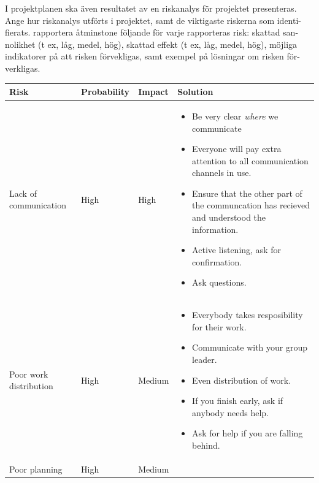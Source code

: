 \documentclass{article}
\begin{document}
    I projektplanen ska även resultatet av en riskanalys för projektet presenteras.
    Ange hur riskanalys utförts i projektet, samt de viktigaste riskerna som identi-
    fierats. rapportera åtminstone följande för varje rapporteras risk: skattad san-
    nolikhet (t ex, låg, medel, hög), skattad effekt (t ex, låg, medel, hög), möjliga
    indikatorer på att risken förvekligas, samt exempel på lösningar om risken för-
    verkligas.
    \begin{table}[h]
        \centering
        \begin{tabular}{|l|l|l|l|}
            \hline
                Risk & Probability & Impact & Solution \\
            \hline
            Lack of communication & High & High 
                & \parbox{.45\textwidth}
                {\begin{itemize}
                    \item Be very clear \emph{where} we communicate
                    \item Everyone will pay extra attention to all communication channels
                        in use.
                    \item Ensure that the other part of the communcation has recieved
                        and understood the information.
                    \item Active listening, ask for confirmation.
                    \item Ask questions.
                 \end{itemize}}\\
            \hline
            Poor work distribution & High & Medium 
                & \parbox{.45\textwidth}
                {\begin{itemize}
                    \item Everybody takes resposibility for their work.
                    \item Communicate with your group leader.
                    \item Even distribution of work.
                    \item If you finish early, ask if anybody needs help. 
                    \item Ask for help if you are falling behind.
                 \end{itemize}}\\
            \hline
            Poor planning & High & Medium 
                & \parbox{.45\textwidth}
                {\begin{itemize}

\end{itemize}}
\end{tabular}
\end{table}
\end{document}
